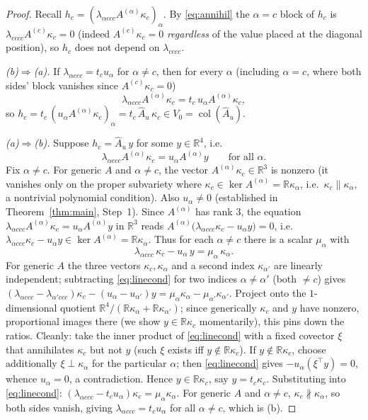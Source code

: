 \documentclass[12pt]{article}
\DeclareMathOperator{\col}{col}
\newcommand{\bR}{\mathbb{R}}
\theoremstyle{definition}
\begin{document}
\begin{proof}
Recall $h_c=(\lambda_{\alpha ccc}A^{(\alpha)}\kappa_c)_\alpha$.  By
\eqref{eq:annihil} the $\alpha=c$ block of $h_c$ is $\lambda_{cccc}A^{(c)}\kappa_c=0$
(indeed $A^{(c)}\kappa_c=0$ \emph{regardless} of the value placed at the diagonal
position), so $h_c$ does not depend on $\lambda_{cccc}$.

\emph{(b)$\Rightarrow$(a).}  If $\lambda_{\alpha ccc}=t_cu_\alpha$ for $\alpha\ne c$,
then for every $\alpha$ (including $\alpha=c$, where both sides' block vanishes since
$A^{(c)}\kappa_c=0$)
\[
\lambda_{\alpha ccc}A^{(\alpha)}\kappa_c=t_c\,u_\alpha A^{(\alpha)}\kappa_c ,
\]
so $h_c=t_c\,(u_\alpha A^{(\alpha)}\kappa_c)_\alpha=t_c\,\widehat A_u\,\kappa_c\in
V_0=\col(\widehat A_u)$.

\emph{(a)$\Rightarrow$(b).}  Suppose $h_c=\widehat A_u\,y$ for some $y\in\bR^4$, i.e.
\begin{equation}\label{eq:hcblock}
\lambda_{\alpha ccc}A^{(\alpha)}\kappa_c=u_\alpha A^{(\alpha)}y\qquad\text{for all }\alpha .
\end{equation}
Fix $\alpha\ne c$.  For generic $A$ and $\alpha\ne c$, the vector $A^{(\alpha)}\kappa_c\in\bR^3$
is nonzero (it vanishes only on the proper subvariety where $\kappa_c\in\ker A^{(\alpha)}
=\bR\kappa_\alpha$, i.e.\ $\kappa_c\parallel\kappa_\alpha$, a nontrivial polynomial
condition).  Also $u_\alpha\ne0$ (established in Theorem~\ref{thm:main}, Step~1).  Since
$A^{(\alpha)}$ has rank $3$, the equation $\lambda_{\alpha ccc}A^{(\alpha)}\kappa_c
=u_\alpha A^{(\alpha)}y$ in $\bR^3$ reads
$A^{(\alpha)}\bigl(\lambda_{\alpha ccc}\kappa_c-u_\alpha y\bigr)=0$, i.e.\
$\lambda_{\alpha ccc}\kappa_c-u_\alpha y\in\ker A^{(\alpha)}=\bR\kappa_\alpha$.  Thus
for each $\alpha\ne c$ there is a scalar $\mu_\alpha$ with
\begin{equation}\label{eq:linecond}
\lambda_{\alpha ccc}\,\kappa_c-u_\alpha\,y=\mu_\alpha\,\kappa_\alpha .
\end{equation}
For generic $A$ the three vectors $\kappa_c,\kappa_\alpha$ and a second index
$\kappa_{\alpha'}$ are linearly independent; subtracting \eqref{eq:linecond} for two
indices $\alpha\ne\alpha'$ (both $\ne c$) gives
$(\lambda_{\alpha ccc}-\lambda_{\alpha'ccc})\kappa_c-(u_\alpha-u_{\alpha'})y
=\mu_\alpha\kappa_\alpha-\mu_{\alpha'}\kappa_{\alpha'}$.  Project onto the
$1$-dimensional quotient $\bR^4/(\bR\kappa_\alpha+\bR\kappa_{\alpha'})$; since
generically $\kappa_c$ and $y$ have nonzero, proportional images there (we show
$y\in\bR\kappa_c$ momentarily), this pins down the ratios.  Cleanly: take the inner
product of \eqref{eq:linecond} with a fixed covector $\xi$ that annihilates
$\kappa_c$ but not $y$ (such $\xi$ exists iff $y\notin\bR\kappa_c$).  If
$y\notin\bR\kappa_c$, choose additionally $\xi\perp\kappa_\alpha$ for the particular
$\alpha$; then \eqref{eq:linecond} gives $-u_\alpha(\xi^\top y)=0$, whence
$u_\alpha=0$, a contradiction.  Hence $y\in\bR\kappa_c$, say $y=t_c\kappa_c$.
Substituting into \eqref{eq:linecond}:
$(\lambda_{\alpha ccc}-t_cu_\alpha)\kappa_c=\mu_\alpha\kappa_\alpha$.  For generic
$A$ and $\alpha\ne c$, $\kappa_c\not\parallel\kappa_\alpha$, so both sides vanish,
giving $\lambda_{\alpha ccc}=t_cu_\alpha$ for all $\alpha\ne c$, which is (b).
\end{proof}
\end{document}
